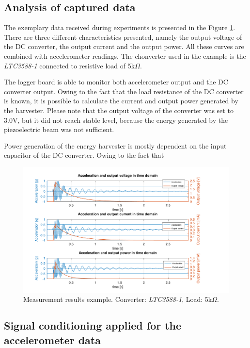 \documentclass[12pt,a4paper]{article}
\begin{document}
\subsection{Analysis of captured data}

The exemplary data received during experiments is presented in the Figure \ref{fig:timedomain}. There are three different characteristics presented, namely the output voltage of the DC converter, the output current and the output power. All these curves are combined with accelerometer readings. The chonverter used in the example is the \textit{LTC3588-1} connected to resistive load of 5k$\Omega$.
\par
The logger board is able to monitor both accelerometer output and the DC converter output. Owing to the fact that the load resistance of the DC converter is known, it is possible to calculate the current and output power generated by the harvester. Please note that the output voltage of the converter was set to 3.0V, but it did not reach stable level, because the energy generated by the piezoelectric beam was not sufficient.
\par
Power generation of the energy harvester is mostly dependent on the input capacitor of the DC converter. Owing to the fact that 


\begin{landscape} 
\begin{figure}[ht!]
\includegraphics[scale=1.05]{timedomain.pdf}
\caption{Measurement results example. Converter: \textit{LTC3588-1}, Load: 5k$\Omega$.}
\label{fig:timedomain}
\end{figure}
\end{landscape}



\subsection{Signal conditioning applied for the accelerometer data}
\end{document}
